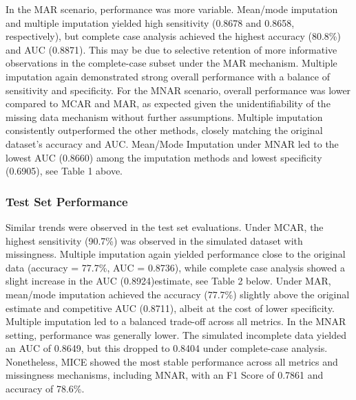 \documentclass[
  letterpaper,
  DIV=11,
  numbers=noendperiod]{scrartcl}
\begin{document}
In the MAR scenario, performance was more variable. Mean/mode imputation
and multiple imputation yielded high sensitivity (0.8678 and 0.8658,
respectively), but complete case analysis achieved the highest accuracy
(80.8\%) and AUC (0.8871). This may be due to selective retention of
more informative observations in the complete-case subset under the MAR
mechanism. Multiple imputation again demonstrated strong overall
performance with a balance of sensitivity and specificity. For the MNAR
scenario, overall performance was lower compared to MCAR and MAR, as
expected given the unidentifiability of the missing data mechanism
without further assumptions. Multiple imputation consistently
outperformed the other methods, closely matching the original dataset's
accuracy and AUC. Mean/Mode Imputation under MNAR led to the lowest AUC
(0.8660) among the imputation methods and lowest specificity (0.6905),
see Table 1 above.

\subsubsection{Test Set Performance}\label{test-set-performance}

Similar trends were observed in the test set evaluations. Under MCAR,
the highest sensitivity (90.7\%) was observed in the simulated dataset
with missingness. Multiple imputation again yielded performance close to
the original data (accuracy = 77.7\%, AUC = 0.8736), while complete case
analysis showed a slight increase in the AUC (0.8924)estimate, see Table
2 below. Under MAR, mean/mode imputation achieved the accuracy (77.7\%)
slightly above the original estimate and competitive AUC (0.8711),
albeit at the cost of lower specificity. Multiple imputation led to a
balanced trade-off across all metrics. In the MNAR setting, performance
was generally lower. The simulated incomplete data yielded an AUC of
0.8649, but this dropped to 0.8404 under complete-case analysis.
Nonetheless, MICE showed the most stable performance across all metrics
and missingness mechanisms, including MNAR, with an F1 Score of 0.7861
and accuracy of 78.6\%.
\end{document}
